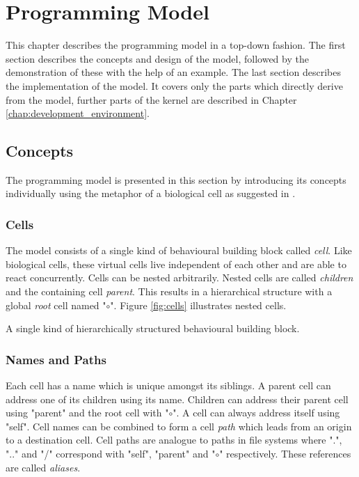 \graphicspath{{figures/programming_model/}}

\chapter{Programming Model}
\label{chap:programming_model}

This chapter describes the programming model in a top-down fashion. The first section describes the concepts and design of the model, followed by the demonstration of these with the help of an example. The last section describes the implementation of the model. It covers only the parts which directly derive from the model, further parts of the kernel are described in Chapter \ref{chap:development_environment}.

\section{Concepts}
\label{sec:concepts}

The programming model is presented in this section by introducing its concepts individually using the metaphor of a biological cell as suggested in \cite{SmalltalkHistory}.

\subsection{Cells}

The model consists of a single kind of behavioural building block called \textit{cell}. Like biological cells, these virtual cells live independent of each other and are able to react concurrently. Cells can be nested arbitrarily. Nested cells are called \textit{children} and the containing cell \textit{parent}. This results in a hierarchical structure with a global \textit{root} cell named "$\circ$". Figure \ref{fig:cells} illustrates nested cells.

{A single kind of hierarchically structured behavioural building block.}

\subsection{Names and Paths}

Each cell has a name which is unique amongst its siblings. A parent cell can address one of its children using its name. Children can address their parent cell using "parent" and the root cell with "$\circ$". A cell can always address itself using "self". Cell names can be combined to form a cell \textit{path} which leads from an origin to a destination cell. Cell paths are analogue to paths in file systems where ".", ".." and "/" correspond with "self", "parent" and "$\circ$" respectively. These references are called \textit{aliases}.

